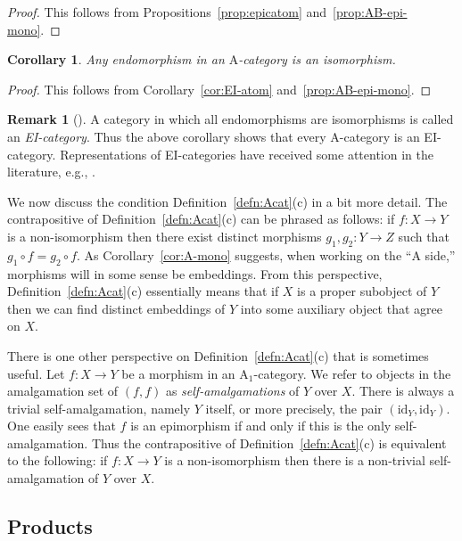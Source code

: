 \documentclass[12pt]{amsart}
\numberwithin{equation}{section}
\newtheorem{corollary}[equation]{Corollary}
\theoremstyle{definition}
\newtheorem{rmk}[equation]{Remark}
\newenvironment{remark}[1][]{\begin{rmk}[#1] \pushQED{\qed}}{\popQED \end{rmk}}
\newcommand{\rA}{\mathrm{A}}
\newcommand{\defn}[1]{\emph{#1}}
\newcommand{\id}{\mathrm{id}}
\begin{document}
\begin{proof}
This follows from Propositions~\ref{prop:epicatom} and~\ref{prop:AB-epi-mono}.
\end{proof}

\begin{corollary} \label{cor:A-EI}
Any endomorphism in an $\rA$-category is an isomorphism.
\end{corollary}

\begin{proof}
This follows from Corollary~\ref{cor:EI-atom}  and~\ref{prop:AB-epi-mono}.
\end{proof}

\begin{remark}
A category in which all endomorphisms are isomorphisms is called an \defn{EI-category}. Thus the above corollary shows that every $\rA$-category is an EI-category. Representations of EI-categories have received some attention in the literature, e.g., \cite{GanLi}.
\end{remark}

We now discuss the condition Definition~\ref{defn:Acat}(c) in a bit more detail. The contrapositive of Definition~\ref{defn:Acat}(c) can be phrased as follows: if $f \colon X \to Y$ is a non-isomorphism then there exist distinct morphisms $g_1,g_2 \colon Y \to Z$ such that $g_1 \circ f = g_2 \circ f$. As Corollary~\ref{cor:A-mono} suggests, when working on the ``$\rA$ side,'' morphisms will in some sense be embeddings. From this perspective, Definition~\ref{defn:Acat}(c) essentially means that if $X$ is a proper subobject of $Y$ then we can find distinct embeddings of $Y$ into some auxiliary object that agree on $X$.

There is one other perspective on Definition~\ref{defn:Acat}(c) that is sometimes useful. Let $f \colon X \to Y$ be a morphism in an $\rA_1$-category. We refer to objects in the amalgamation set of $(f,f)$ as \defn{self-amalgamations} of $Y$ over $X$. There is always a trivial self-amalgamation, namely $Y$ itself, or more precisely, the pair $(\id_Y, \id_Y)$. One easily sees that $f$ is an epimorphism if and only if this is the only self-amalgamation. Thus the contrapositive of Definition~\ref{defn:Acat}(c) is equivalent to the following: if $f \colon X \to Y$ is a non-isomorphism then there is a non-trivial self-amalgamation of $Y$ over $X$.

\subsection{Products}
\end{document}
